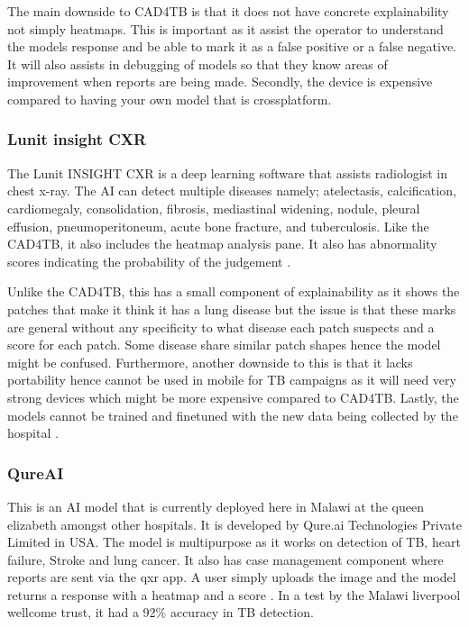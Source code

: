 \documentclass[12pt,a4paper]{article}
\begin{document}
The main downside to CAD4TB is that it does not have concrete explainability not simply heatmaps. This is important as it assist the operator to understand the models response and be able to mark it as a false positive or a false negative. It will also assists in debugging of models so that they know areas of improvement when reports are being made.
Secondly, the device is expensive compared to having your own model that is crossplatform.

\subsubsection{Lunit insight CXR}
The Lunit INSIGHT CXR is a deep learning software that assists radiologist in chest x-ray. The AI can detect multiple diseases namely; atelectasis, calcification, cardiomegaly, consolidation, fibrosis, mediastinal widening, nodule, pleural effusion, pneumoperitoneum, acute bone fracture, and tuberculosis. Like the CAD4TB, it also includes the heatmap analysis pane. It also has abnormality scores indicating the probability of the judgement \citep{Lunit-insight-cxr42025}.

Unlike the CAD4TB, this has a small component of explainability as it shows the patches that make it think it has a lung disease but the issue is that these marks are general without any specificity to what disease each patch suspects and a score for each patch. Some disease share similar patch shapes hence the model might be confused.
Furthermore, another downside to this is that it lacks portability hence cannot be used in mobile for TB campaigns as it will need very strong devices which might be more expensive compared to CAD4TB. Lastly, the models cannot be trained and finetuned with the new data being collected by the hospital \citep{Lunit-insight-cxr42025}.

\subsubsection{QureAI}
This is an AI model that is currently deployed here in Malawi at the queen elizabeth amongst other hospitals. It is developed by Qure.ai Technologies Private Limited in USA. The model is multipurpose as it works on detection of TB, heart failure, Stroke and lung cancer. It also has case management component where reports are sent via the qxr app. A user simply uploads the image and the model returns a response with a heatmap and a score \citep{Twabi2021}. In a test by the Malawi liverpool wellcome trust, it had a 92\% accuracy in TB detection. 
\end{document}
